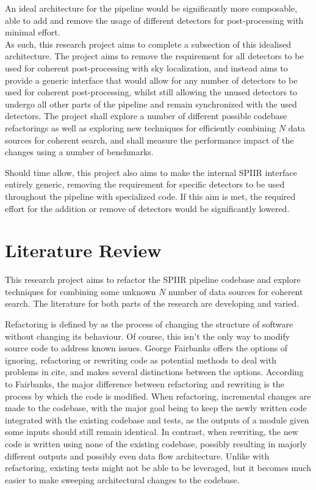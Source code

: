 \documentclass{article}
\begin{document}
An ideal architecture for the pipeline would be significantly more composable, able to add and
remove the usage of different detectors for post-processing with minimal effort.
\\

As such, this research project aims to complete a subsection of this idealised architecture. The
project aims to remove the requirement for all detectors to be used for coherent post-processing
with sky localization, and instead aims to provide a generic interface that would allow for any
number of detectors to be used for coherent post-processing, whilst still allowing the unused
detectors to undergo all other parts of the pipeline and remain synchronized with the used
detectors. The project shall explore a number of different possible codebase refactorings as well as
exploring new techniques for efficiently combining \(N\) data sources for coherent search, and shall
measure the performance impact of the changes using a number of benchmarks.

Should time allow, this project also aims to make the internal SPIIR interface entirely generic,
removing the requirement for specific detectors to be used throughout the pipeline with specialized
code. If this aim is met, the required effort for the addition or remove of detectors would be
significantly lowered.

\section{Literature Review}

This research project aims to refactor the SPIIR pipeline codebase and explore techniques for
combining some unknown \(N\) number of data sources for coherent search. The literature for both
parts of the research are developing and varied.

Refactoring is defined by %
as the process of changing the structure of software without changing
its behaviour. Of course, this isn't the only way to modify source code to address known issues.
George Fairbanks offers the options of ignoring, refactoring or rewriting code as potential methods
to deal with problems in cite, and makes several distinctions between the options. According to
Fairbanks, the major difference between refactoring and rewriting is the process by which the code
is modified. When refactoring, incremental changes are made to the codebase, with the major goal
being to keep the newly written code integrated with the existing codebase and tests, as the outputs
of a module given some inputs should still remain identical. In contrast, when rewriting, the new
code is written using none of the existing codebase, possibly resulting in majorly different outputs
and possibly even data flow architecture. Unlike with refactoring, existing tests might not be able
to be leveraged, but it becomes much easier to make sweeping architectural changes to the codebase.
\end{document}
